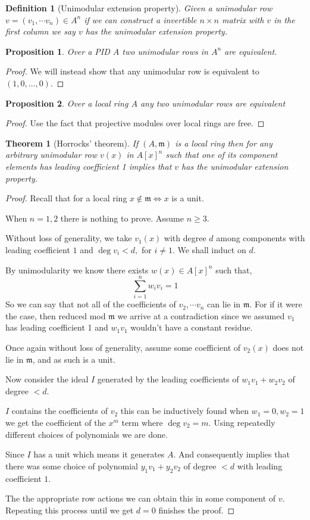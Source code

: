 \documentclass[12pt]{article}
\numberwithin{equation}{section}
\newtheorem{theorem}{Theorem}[section]
\newtheorem{definition}{Definition}[section]
\newtheorem{proposition}{Proposition}[section]
\begin{document}
	\begin{definition}[Unimodular extension property]
		Given a unimodular row $v=(v_1,\cdots v_n) \in A^n$ if we can construct a invertible $n \times n $  matrix with $v$ in the first column we say $v$ has the unimodular extension property.
	\end{definition}
	
	\begin{proposition}
		Over a PID $A$ two unimodular rows in $A^n$ are equivalent.
	\end{proposition}
	\begin{proof}
		We will instead show that any unimodular row is equivalent to $(1,0,\dots, 0)$.
	\end{proof}
	\begin{proposition}
		Over a local ring $A$ any two unimodular rows are equivalent
	\end{proposition}
	\begin{proof}
		Use the fact that projective modules over local rings are free.
	\end{proof}
	\begin{theorem}[Horrocks' theorem]
	If $(A, \mathfrak{m})$ is a local ring then for any arbitrary unimodular row $v(x)$ in $A[x]^n$ such that one of its component elements has leading coefficient 1 implies that $v$ has the unimodular extension property.
	\end{theorem}
	\begin{proof}
	Recall that for a local ring $x \not \in \mathfrak m \iff x  $ is a unit.
	
	When $n=1,2 $ there is nothing to prove. Assume $n \geq 3$.
	
	
	Without loss of generality, we take $v_1(x)$ with degree $d $ among components with leading coefficient $1$ and $\deg v_i < d, $ for $i \neq 1$. We shall induct on $d$.
	
	By unimodularity we know there exists $w(x)\in A[x]^n$ such that,
	\[ \sum_{i=1}^n w_i v_i = 1 \]
	So we can say that not all of the coefficients of $v_2, \cdots v_n $ can lie in $\mathfrak m$. For if it were the case, then reduced mod $\mathfrak m$ we arrive at a contradiction since we assumed $v_1 $ has leading coefficient 1 and $w_1v_1$ wouldn't have a constant residue.
	
	Once again without loss of generality, assume some coefficient of $v_2(x)$ does not lie in $\mathfrak m$, and as such is a unit.
	
	Now consider the ideal $I$ generated by the leading coefficients of $w_1v_1+w_2v_2$ of degree $< d.$ 
	
	$I$ contains the coefficients of $v_2$ this can be inductively found when $w_1=0, w_2=1$ we get the coefficient of the $x^m$ term where $\deg v_2 = m$.
	Using repeatedly different choices of polynomials we are done.
	
	Since $I$ has a unit which means it generates $A$. And consequently implies that there was some choice of polynomial $y_1v_1+y_2v_2$ of degree $<d$ with leading coefficient $1$.
	
	The the appropriate row actions we can obtain this in some component of $v$. Repeating this process until we get $d=0$ finishes the proof.
	\end{proof}
\end{document}
